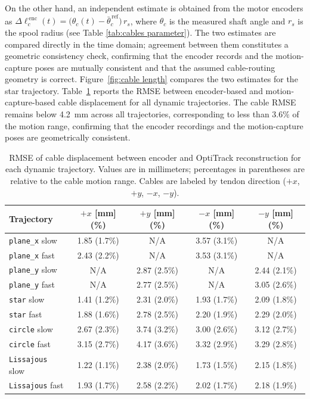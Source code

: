 \documentclass[14pt, a4paper]{article}
\begin{document}
On the other hand, an independent estimate is obtained from the motor encoders as $\Delta \ell_c^{\,\mathrm{enc}}(t) = \bigl(\theta_c(t) - \bar{\theta}_c^{\,\mathrm{ref}}\bigr)\,r_s$, where $\theta_c$ is the measured shaft angle and $r_s$ is the spool radius (see Table \ref{tab:cables parameter}).
The two estimates are compared directly in the time domain; agreement between them constitutes a geometric consistency check, confirming that the encoder records and the motion-capture poses are mutually consistent and that the assumed cable-routing geometry is correct.
%
Figure~\ref{fig:cable length} compares the two estimates for the star trajectory.
Table~\ref{tab:rmse_cables} reports the RMSE between encoder-based and motion-capture-based cable displacement for all dynamic trajectories.
The cable RMSE remains below \SI{4.2}{\milli\meter} across all trajectories, corresponding to less than $3.6\%$ of the motion range, confirming that the encoder recordings and the motion-capture poses are geometrically consistent.

\begin{table}[ht]
\centering
\caption{RMSE of cable displacement between encoder and OptiTrack reconstruction for each dynamic trajectory.
Values are in millimeters; percentages in parentheses are relative to the cable motion range. Cables are labeled by tendon direction ($+x$, $+y$, $-x$, $-y$).}
\label{tab:rmse_cables}
\renewcommand{\arraystretch}{1.2}
\footnotesize
\begin{tabular}{@{} l c c c c @{}}
\toprule
\textbf{Trajectory} & \textbf{$+x$ [mm] (\%)} & \textbf{$+y$ [mm] (\%)} & \textbf{$-x$ [mm] (\%)} & \textbf{$-y$ [mm] (\%)} \\
\midrule
\texttt{plane\_x} slow  & 1.85 (1.7\%) & N/A & 3.57 (3.1\%) & N/A \\
\texttt{plane\_x} fast  & 2.43 (2.2\%) & N/A & 3.53 (3.1\%) & N/A \\
\texttt{plane\_y} slow  & N/A & 2.87 (2.5\%) & N/A & 2.44 (2.1\%) \\
\texttt{plane\_y} fast  & N/A & 2.77 (2.5\%) & N/A & 3.05 (2.6\%) \\
\texttt{star} slow      & 1.41 (1.2\%) & 2.31 (2.0\%) & 1.93 (1.7\%) & 2.09 (1.8\%) \\
\texttt{star} fast      & 1.88 (1.6\%) & 2.78 (2.5\%) & 2.20 (1.9\%) & 2.29 (2.0\%) \\
\texttt{circle} slow    & 2.67 (2.3\%) & 3.74 (3.2\%) & 3.00 (2.6\%) & 3.12 (2.7\%) \\
\texttt{circle} fast    & 3.15 (2.7\%) & 4.17 (3.6\%) & 3.32 (2.9\%) & 3.29 (2.8\%) \\
\texttt{Lissajous} slow & 1.22 (1.1\%) & 2.38 (2.0\%) & 1.73 (1.5\%) & 2.15 (1.8\%) \\
\texttt{Lissajous} fast & 1.93 (1.7\%) & 2.58 (2.2\%) & 2.02 (1.7\%) & 2.18 (1.9\%) \\
\bottomrule
\end{tabular}
\end{table}
\end{document}
